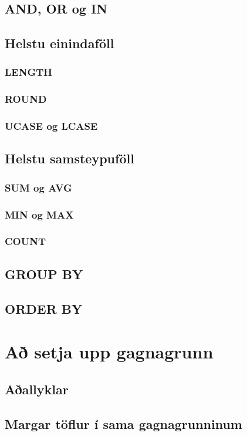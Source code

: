 \documentclass[nohyper,notoc,justified]{tufte-book}
\begin{document}
\section{AND, OR og IN}
\section{Helstu einindaföll}
\subsection{LENGTH}
\subsection{ROUND}
\subsection{UCASE og LCASE}
\section{Helstu samsteypuföll}
\subsection{SUM og AVG}
\subsection{MIN og MAX}
\subsection{COUNT}
\section{GROUP BY}
\section{ORDER BY}

\chapter{Að setja upp gagnagrunn}
\section{Aðallyklar} %
\section{Margar töflur í sama gagnagrunninum}
\end{document}
